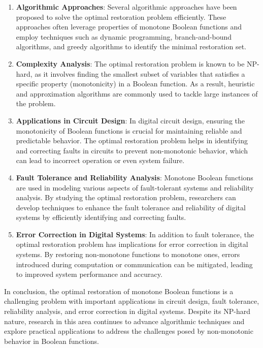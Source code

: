 \documentclass{article}
\renewcommand{\_}{\ifincsname_\else\legacyunderscore\fi}
\begin{document}
\begin{enumerate}
    \item \textbf{Algorithmic Approaches}: Several algorithmic approaches have been proposed to solve the optimal restoration problem efficiently. These approaches often leverage properties of monotone Boolean functions and employ techniques such as dynamic programming, branch-and-bound algorithms, and greedy algorithms to identify the minimal restoration set.
    
    \item \textbf{Complexity Analysis}: The optimal restoration problem is known to be NP-hard, as it involves finding the smallest subset of variables that satisfies a specific property (monotonicity) in a Boolean function. As a result, heuristic and approximation algorithms are commonly used to tackle large instances of the problem.
    
    \item \textbf{Applications in Circuit Design}: In digital circuit design, ensuring the monotonicity of Boolean functions is crucial for maintaining reliable and predictable behavior. The optimal restoration problem helps in identifying and correcting faults in circuits to prevent non-monotonic behavior, which can lead to incorrect operation or even system failure.
    
    \item \textbf{Fault Tolerance and Reliability Analysis}: Monotone Boolean functions are used in modeling various aspects of fault-tolerant systems and reliability analysis. By studying the optimal restoration problem, researchers can develop techniques to enhance the fault tolerance and reliability of digital systems by efficiently identifying and correcting faults.
    
    \item \textbf{Error Correction in Digital Systems}: In addition to fault tolerance, the optimal restoration problem has implications for error correction in digital systems. By restoring non-monotone functions to monotone ones, errors introduced during computation or communication can be mitigated, leading to improved system performance and accuracy.
\end{enumerate}

In conclusion, the optimal restoration of monotone Boolean functions is a challenging problem with important applications in circuit design, fault tolerance, reliability analysis, and error correction in digital systems. Despite its NP-hard nature, research in this area continues to advance algorithmic techniques and explore practical applications to address the challenges posed by non-monotonic behavior in Boolean functions.
\end{document}

